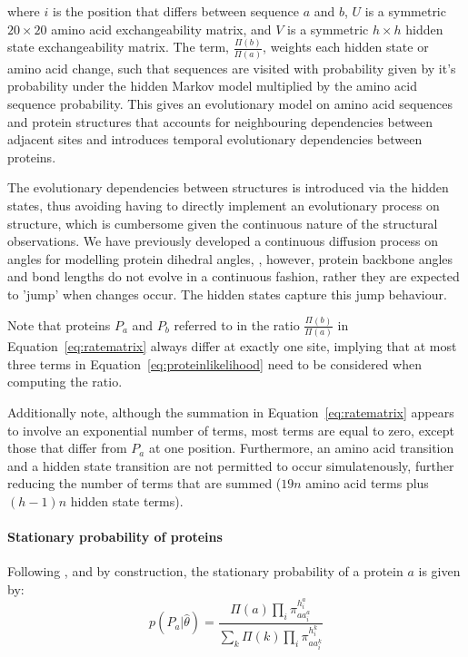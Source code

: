 \documentclass[nogrid]{MBE}%
\begin{document}
where $i$ is the position that differs between sequence $a$ and $b$, $U$ is a symmetric $20\times{20}$ amino acid exchangeability matrix, and $V$ is a symmetric $h\times{h}$ hidden state exchangeability matrix. The term, $\frac{\Pi(b)}{\Pi(a)}$, weights each hidden state or amino acid change, such that sequences are visited with probability given by it's probability under the hidden Markov model multiplied by the amino acid sequence probability. This gives an evolutionary model on amino acid sequences and protein structures that accounts for neighbouring dependencies between adjacent sites and introduces temporal evolutionary dependencies between proteins.

The evolutionary dependencies between structures is introduced via the hidden states, thus avoiding having to directly implement an evolutionary process on structure, which is cumbersome given the continuous nature of the structural observations. We have previously developed a continuous diffusion process on angles for modelling protein dihedral angles, \citep{Garcia-Portugues:ads, Golden2017}, however,  protein backbone angles and bond lengths do not evolve in a continuous fashion, rather they are expected to 'jump' when changes occur. The hidden states capture this jump behaviour.
 
Note that proteins $P_a$ and $P_b$ referred to in the ratio $\frac{\Pi(b)}{\Pi(a)}$ in Equation~\ref{eq:ratematrix} always differ at exactly one site, implying that at most three terms in Equation~\ref{eq:proteinlikelihood} need to be considered when computing the ratio. 

Additionally note, although the summation in Equation~\ref{eq:ratematrix} appears to involve an exponential number of terms, most terms are equal to zero, except those that differ from $P_a$ at one position. Furthermore, an amino acid transition and a hidden state transition are not permitted to occur simulatenously, further reducing the number of terms that are summed ($19n$ amino acid terms plus $(h-1)n$ hidden state terms).


\paragraph{Stationary probability of proteins}
Following \citet{choi2008basing}, and by construction, the stationary probability of a protein $a$ is given by:
\begin{equation}
\label{eq:stationary_dist}
p(P_a|\hat{\theta}) = \frac{ \Pi(a) \underset{i}{\prod}\pi^{h^{a}_{i}}_{aa^{a}_{i}} }{ \sum_{k} \Pi(k) \underset{i}{\prod}\pi^{h^{k}_{i}}_{aa^{k}_{i}} } 
\end{equation}
\end{document}
